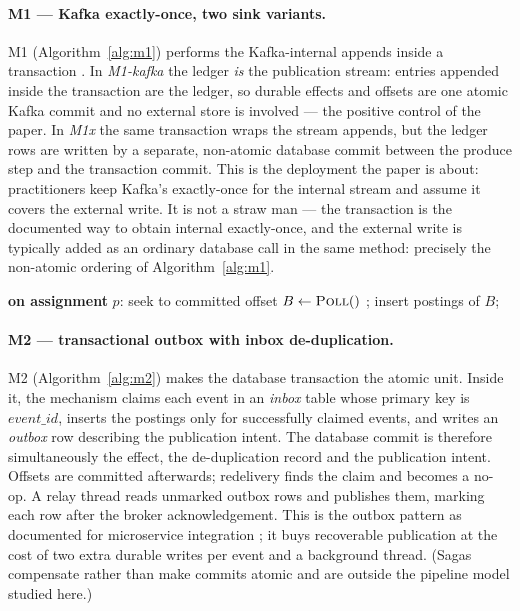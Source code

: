 \paragraph{M1 --- Kafka exactly-once, two sink variants.}
M1 (Algorithm~\ref{alg:m1}) performs the Kafka-internal appends inside a transaction
\cite{kip98,kip447,kafka-design}. In \emph{M1-kafka} the ledger \emph{is} the publication
stream: entries appended inside the transaction are the ledger, so durable effects and offsets
are one atomic Kafka commit and no external store is involved --- the positive control of the
paper. In \emph{M1x} the same transaction wraps the stream appends, but the ledger rows are
written by a separate, non-atomic database commit between the produce step and the transaction
commit. This is the deployment the paper is about: practitioners keep Kafka's exactly-once for the
internal stream and assume it covers the external write. It is not a straw man --- the
transaction is the documented way to obtain internal exactly-once, and the external write is
typically added as an ordinary database call in the same method: precisely the non-atomic
ordering of Algorithm~\ref{alg:m1}.

\begin{algorithm}[t]
\footnotesize
\begin{algorithmic}[1]
\State \textbf{on assignment} $p$: seek to committed offset
\Loop
  \State $B \gets \Call{Poll}{ }$
  \State {}
    \State {} 
  \EndFor
    \State {}; insert postings of $B$;  
  \EndIf
  \State {} 
  \State {} 
\EndLoop
\end{algorithmic}
\caption{M1 family: Kafka transaction (M1-kafka and M1x)}
\label{alg:m1}
\end{algorithm}

\paragraph{M2 --- transactional outbox with inbox de-duplication.}
M2 (Algorithm~\ref{alg:m2}) makes the database transaction the atomic unit. Inside it, the
mechanism claims each event in an \emph{inbox} table whose primary key is
$\mathit{event\_id}$, inserts the postings only for successfully claimed events, and writes an
\emph{outbox} row describing the publication intent. The database commit is therefore
simultaneously the effect, the de-duplication record and the publication intent. Offsets are
committed afterwards; redelivery finds the claim and becomes a no-op. A relay thread reads
unmarked outbox rows and publishes them, marking each row after the broker acknowledgement.
This is the outbox pattern as documented for microservice integration
\cite{debezium-outbox,laigner2021,micro2026}; it buys recoverable publication at the cost of
two extra durable writes per event and a background thread. (Sagas
\cite{sagas1987,saga2019} compensate rather than make commits atomic and are outside the
pipeline model studied here.)

